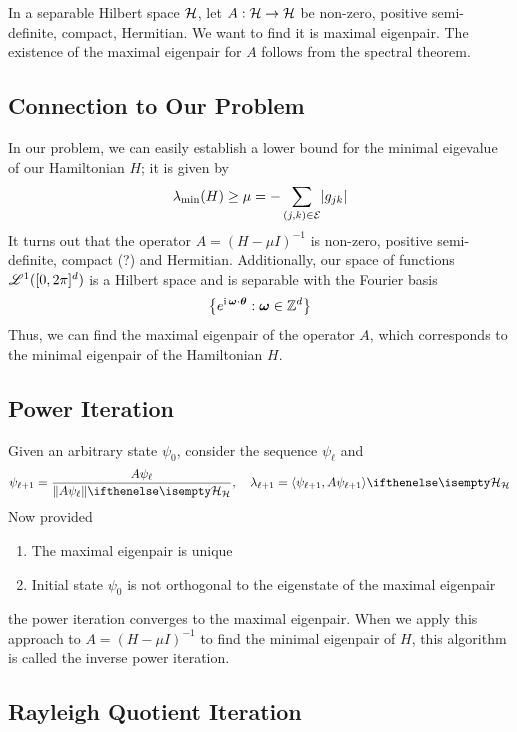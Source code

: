 \documentclass{amsart}
\begin{document}
In a separable Hilbert space $\mathcal{H}$, let $A : \mathcal{H} \to \mathcal{H}$ be non-zero, positive
semi-definite, compact, Hermitian. We want to find it is maximal eigenpair. The
existence of the maximal eigenpair for $A$ follows from the spectral theorem.

\subsection{Connection to Our Problem}

In our problem, we can easily establish a lower bound for the minimal eigevalue
of our Hamiltonian $H$; it is given by
\begin{equation}
  \lambda_\text{min}(H) \geq \mu = -\sum_{(j, k) \in \mathcal{E}} \lvert g_{jk}\rvert
\end{equation}
It turns out that the operator $A = (H - \mu I)^{-1}$ is non-zero, positive
semi-definite, compact (?) and Hermitian. Additionally, our space of functions
$\mathscr{L}^1([0, 2\pi]^d)$ is a Hilbert space and is separable with the Fourier basis
\begin{equation}
  \left\{e^{\operatorname{i} \bm{\omega} \cdot \bm{\theta}} : \bm{\omega} \in \mathbb{Z}^d\right\}
\end{equation}
Thus, we can find the maximal eigenpair of the operator $A$, which corresponds
to the minimal eigenpair of the Hamiltonian $H$.

\subsection{Power Iteration}

Given an arbitrary state $\psi_0$, consider the sequence $\psi_\ell$ and
\begin{equation}
  \psi_{\ell + 1} = \frac{A \psi_\ell}{\Norm[\CH]{A \psi_\ell}}, \quad
  \lambda_{\ell + 1} = \InProd[\CH]{\psi_{\ell + 1}}{A \psi_{\ell + 1}}
\end{equation}
Now provided
\begin{enumerate}
  \item
    The maximal eigenpair is unique
  \item
    Initial state $\psi_0$ is not orthogonal to the eigenstate of the maximal
    eigenpair
\end{enumerate}
the power iteration converges to the maximal eigenpair. When we apply this
approach to $A = (H - \mu I)^{-1}$ to find the minimal eigenpair of $H$, this
algorithm is called the inverse power iteration.

\subsection{Rayleigh Quotient Iteration}
\end{document}
